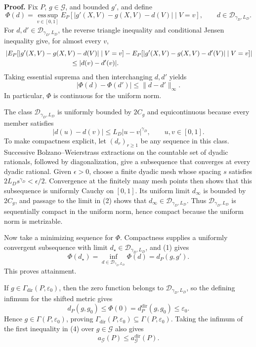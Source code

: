 \textbf{Proof.}
Fix \(P\), \(g\in\mathcal G\), and bounded \(g'\), and define
\[
 \Phi(d)=\operatorname*{ess\,sup}_{v\in[0,1]}
 E_P\!\left[\left|g'(X,V)-g(X,V)-d(V)\right|\mid V=v\right],
 \qquad d\in\mathcal D_{\gamma_D,L_D}.
\]
For \(d,d'\in\mathcal D_{\gamma_D,L_D}\), the reverse triangle inequality and conditional Jensen inequality give, for almost every \(v\),
\[
 \begin{aligned}
 &\left|E_P\!\left[|g'(X,V)-g(X,V)-d(V)|\mid V=v\right]
       -E_P\!\left[|g'(X,V)-g(X,V)-d'(V)|\mid V=v\right]\right|\\
 &\hspace{35mm}\le |d(v)-d'(v)|.
 \end{aligned}
\]
Taking essential suprema and then interchanging \(d,d'\) yields
\[
 |\Phi(d)-\Phi(d')|\le \|d-d'\|_\infty. \tag{1}
\]
In particular, \(\Phi\) is continuous for the uniform norm.

The class \(\mathcal D_{\gamma_D,L_D}\) is uniformly bounded by \(2C_g\) and equicontinuous because every member satisfies
\[
 |d(u)-d(v)|\le L_D|u-v|^{\gamma_D},
 \qquad u,v\in[0,1]. \tag{2}
\]
To make compactness explicit, let \((d_r)_{r\ge1}\) be any sequence in this class. Successive Bolzano--Weierstrass extractions on the countable set of dyadic rationals, followed by diagonalization, give a subsequence that converges at every dyadic rational. Given \(\epsilon>0\), choose a finite dyadic mesh whose spacing \(s\) satisfies \(2L_Ds^{\gamma_D}<\epsilon/2\). Convergence at the finitely many mesh points then shows that this subsequence is uniformly Cauchy on \([0,1]\). Its uniform limit \(d_\infty\) is bounded by \(2C_g\), and passage to the limit in (2) shows that \(d_\infty\in\mathcal D_{\gamma_D,L_D}\). Thus \(\mathcal D_{\gamma_D,L_D}\) is sequentially compact in the uniform norm, hence compact because the uniform norm is metrizable.

Now take a minimizing sequence for \(\Phi\). Compactness supplies a uniformly convergent subsequence with limit \(d_\star\in\mathcal D_{\gamma_D,L_D}\), and (1) gives
\[
 \Phi(d_\star)=\inf_{d\in\mathcal D_{\gamma_D,L_D}}\Phi(d)=d_P(g,g'). \tag{3}
\]
This proves attainment.

If \(g\in\Gamma_{\mathrm{dir}}(P,\varepsilon_0)\), then the zero function belongs to \(\mathcal D_{\gamma_D,L_D}\), so the defining infimum for the shifted metric gives
\[
 d_P(g,g_0)
 \le \Phi(0)
 =d_P^{\mathrm{dir}}(g,g_0)
 \le\varepsilon_0. \tag{4}
\]
Hence \(g\in\Gamma(P,\varepsilon_0)\), proving
\(\Gamma_{\mathrm{dir}}(P,\varepsilon_0)\subseteq\Gamma(P,\varepsilon_0)\). Taking the infimum of the first inequality in (4) over \(g\in\mathcal G\) also gives
\[
 a_{\mathcal G}(P)\le a_{\mathcal G}^{\mathrm{dir}}(P). \tag{5}
\]


